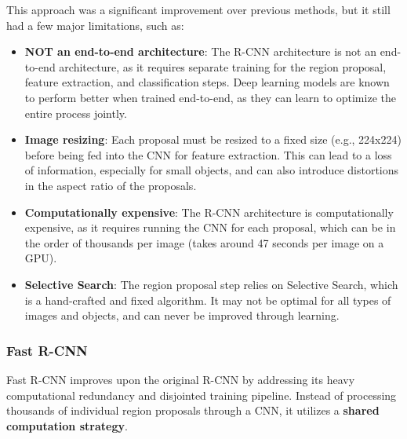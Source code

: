 This approach was a significant improvement over previous methods, but it still had a few major limitations, such as:
\begin{itemize}
    \item \textbf{NOT an end-to-end architecture}: The R-CNN architecture is not an end-to-end architecture, as it requires separate training for the region proposal, feature extraction, and classification steps.
    Deep learning models are known to perform better when trained end-to-end, as they can learn to optimize the entire process jointly.
    
    \item \textbf{Image resizing}: Each proposal must be resized to a fixed size (e.g., 224x224) before being fed into the CNN for feature extraction.
    This can lead to a loss of information, especially for small objects, and can also introduce distortions in the aspect ratio of the proposals.
    
    \item \textbf{Computationally expensive}: The R-CNN architecture is computationally expensive, as it requires running the CNN for each proposal, 
    which can be in the order of thousands per image (takes around 47 seconds per image on a GPU).
    
    \item \textbf{Selective Search}: The region proposal step relies on Selective Search, which is a hand-crafted and fixed algorithm.
    It may not be optimal for all types of images and objects, and can never be improved through learning.
\end{itemize}

\subsubsection{Fast R-CNN}
Fast R-CNN improves upon the original R-CNN by addressing its heavy computational redundancy and disjointed training pipeline. 
Instead of processing thousands of individual region proposals through a CNN, it utilizes a \textbf{shared computation strategy}.

